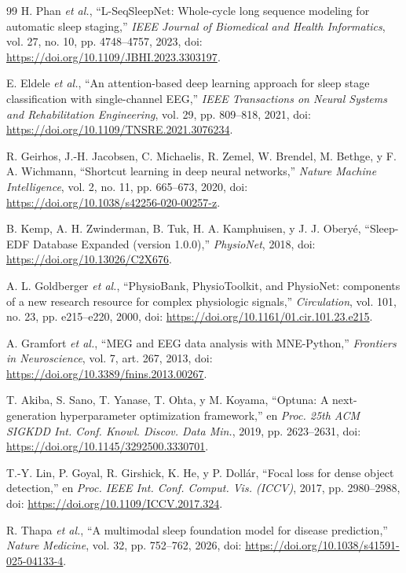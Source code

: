 \documentclass[conference]{IEEEtran}
\begin{document}
\begin{thebibliography}{99}
H. Phan \textit{et al.}, ``L-SeqSleepNet: Whole-cycle long sequence modeling for automatic sleep staging,'' \textit{IEEE Journal of Biomedical and Health Informatics}, vol. 27, no. 10, pp. 4748--4757, 2023, doi: \url{https://doi.org/10.1109/JBHI.2023.3303197}.

E. Eldele \textit{et al.}, ``An attention-based deep learning approach for sleep stage classification with single-channel EEG,'' \textit{IEEE Transactions on Neural Systems and Rehabilitation Engineering}, vol. 29, pp. 809--818, 2021, doi: \url{https://doi.org/10.1109/TNSRE.2021.3076234}.

R. Geirhos, J.-H. Jacobsen, C. Michaelis, R. Zemel, W. Brendel, M. Bethge, y F. A. Wichmann, ``Shortcut learning in deep neural networks,'' \textit{Nature Machine Intelligence}, vol. 2, no. 11, pp. 665--673, 2020, doi: \url{https://doi.org/10.1038/s42256-020-00257-z}.

B. Kemp, A. H. Zwinderman, B. Tuk, H. A. Kamphuisen, y J. J. Oberyé, ``Sleep-EDF Database Expanded (version 1.0.0),'' \textit{PhysioNet}, 2018, doi: \url{https://doi.org/10.13026/C2X676}.

A. L. Goldberger \textit{et al.}, ``PhysioBank, PhysioToolkit, and PhysioNet: components of a new research resource for complex physiologic signals,'' \textit{Circulation}, vol. 101, no. 23, pp. e215--e220, 2000, doi: \url{https://doi.org/10.1161/01.cir.101.23.e215}.

A. Gramfort \textit{et al.}, ``MEG and EEG data analysis with MNE-Python,'' \textit{Frontiers in Neuroscience}, vol. 7, art. 267, 2013, doi: \url{https://doi.org/10.3389/fnins.2013.00267}.

T. Akiba, S. Sano, T. Yanase, T. Ohta, y M. Koyama, ``Optuna: A next-generation hyperparameter optimization framework,'' en \textit{Proc. 25th ACM SIGKDD Int. Conf. Knowl. Discov. Data Min.}, 2019, pp. 2623--2631, doi: \url{https://doi.org/10.1145/3292500.3330701}.

T.-Y. Lin, P. Goyal, R. Girshick, K. He, y P. Dollár, ``Focal loss for dense object detection,'' en \textit{Proc. IEEE Int. Conf. Comput. Vis. (ICCV)}, 2017, pp. 2980--2988, doi: \url{https://doi.org/10.1109/ICCV.2017.324}.

R. Thapa \textit{et al.}, ``A multimodal sleep foundation model for disease prediction,'' \textit{Nature Medicine}, vol. 32, pp. 752--762, 2026, doi: \url{https://doi.org/10.1038/s41591-025-04133-4}.

\end{thebibliography}
\end{document}
